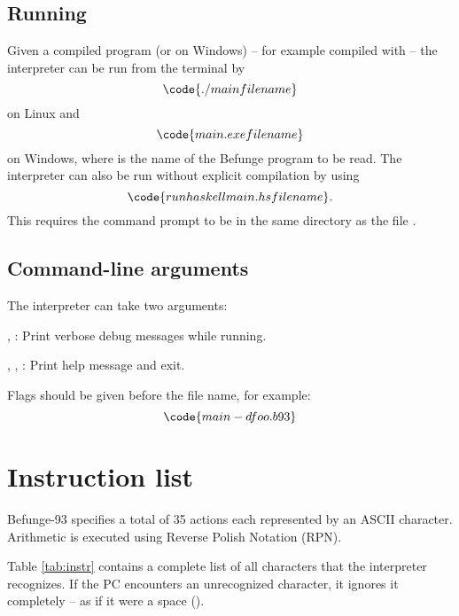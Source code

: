 \documentclass[12pt, a4paper]{article}
\begin{document}
\subsection{Running}
\label{sec:run}

Given a compiled program  (or  on Windows) -- for example compiled with  -- the interpreter can be run from the terminal by
$$\code{./main filename}$$
on Linux and
$$\code{main.exe filename}$$
on Windows, where  is the name of the Befunge program to be read. The interpreter can also be run without explicit compilation by using
$$\code{runhaskell main.hs filename}.$$
This requires the command prompt to be in the same directory as the file .

\subsection{Command-line arguments}
\label{sec:args}

The interpreter can take two arguments:

\vspace{6pt}
\noindent
{},  : Print verbose debug messages while running.

\vspace{6pt}
\noindent
{}, ,  : Print help message and exit.

\vspace{6pt}
\noindent
Flags should be given before the file name, for example:
$$\code{main -d foo.b93}$$

\section{Instruction list}
\label{sec:instructions}

Befunge-93 specifies a total of 35 actions each represented by an ASCII character. Arithmetic is executed using Reverse Polish Notation (RPN).

Table \ref{tab:instr} contains a complete list of all characters that the interpreter recognizes. If the PC encounters an unrecognized character, it ignores it completely -- as if it were a space (\textvisiblespace).
\end{document}
